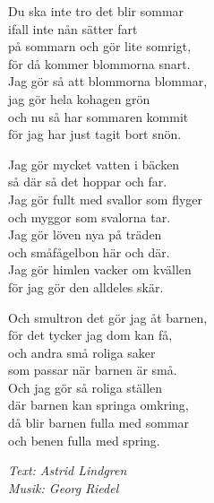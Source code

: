 \vspace{10pt}
Du ska inte tro det blir sommar\\
ifall inte nån sätter fart\\
på sommarn och gör lite somrigt,\\
för då kommer blommorna snart.\\
Jag gör så att blommorna blommar,\\
jag gör hela kohagen grön\\
och nu så har sommaren kommit\\
för jag har just tagit bort snön.\par
\vspace{10pt}
Jag gör mycket vatten i bäcken\\
så där så det hoppar och far.\\
Jag gör fullt med svallor som flyger\\
och myggor som svalorna tar.\\
Jag gör löven nya på träden\\
och småfågelbon här och där.\\
Jag gör himlen vacker om kvällen\\
för jag gör den alldeles skär.\par
\vspace{10pt}
Och smultron det gör jag åt barnen,\\
för det tycker jag dom kan få,\\
och andra små roliga saker\\
som passar när barnen är små.\\
Och jag gör så roliga ställen\\
där barnen kan springa omkring,\\
då blir barnen fulla med sommar\\
och benen fulla med spring.
\par
\vspace{10pt}
{\footnotesize\textit{Text: Astrid Lindgren\\ Musik: Georg Riedel}}
